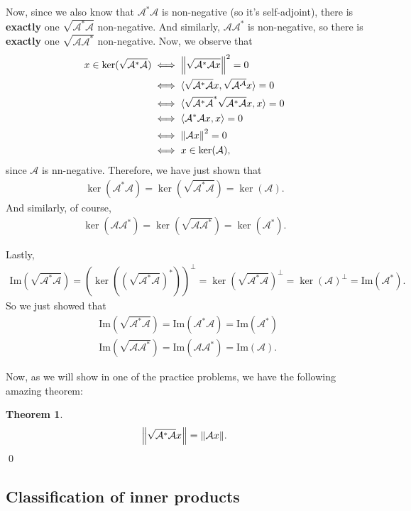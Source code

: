 \documentclass{article}
\theoremstyle{definition}
\newtheorem{thm}{Theorem}[section]
\newcommand{\A}{\mathcal{A}}
\newcommand{\ima}{\text{Im}}
\newcommand{\la}{\langle}
\newcommand{\ra}{\rangle}
\newcommand{\lp}{\left(}
\newcommand{\rp}{\right)}
\begin{document}
Now, since we also know that $\A^*\A$ is non-negative (so it's self-adjoint), there is \textbf{exactly} one $\sqrt{\A^*\A}$ non-negative. And similarly, $\A\A^*$ is non-negative, so there is \textbf{exactly} one $\sqrt{\A\A^*}$ non-negative. Now, we observe that
\begin{align*}
x \in \ker(\sqrt{\A^*\A}) &\iff \norm{\sqrt{\A^*\A x}}^2 = 0\\
&\iff \la \sqrt{\A^*\A} x , \sqrt{\A^\A} x \ra = 0\\
&\iff \la \sqrt{\A^*\A}^* \sqrt{\A^*\A}  x,x  \ra = 0\\
&\iff \la \A^*\A x,x \ra = 0\\
&\iff \norm{\A x}^2 = 0 \\
&\iff x\in \ker(\A),
\end{align*}
since $\A$ is nn-negative. Therefore, we have just shown that
\begin{align*}
\ker(\A^*\A) =\ker(\sqrt{\A^*\A}) = \ker(\A).
\end{align*}
And similarly, of course,
\begin{align*}
\ker(\A\A^*) = \ker(\sqrt{\A\A^*}) = \ker(\A^*).
\end{align*}

Lastly, 
\begin{align*}
\ima(\sqrt{\A^*\A}) = \lp \ker({(\sqrt{\A^*\A})}^*) \rp^\perp = \ker(\sqrt{\A^*\A})^\perp = \ker(\A)^\perp = \ima(\A^*).
\end{align*}
So we just showed that
\begin{align*}
& \ima(\sqrt{\A^*\A}) = \ima(\A^*\A) = \ima(\A^*)\\
& \ima(\sqrt{\A\A^*}) = \ima(\A\A^*) = \ima(\A).
\end{align*}


Now, as we will show in one of the practice problems, we have the following amazing theorem:

\begin{thm}
	\begin{align*}
	\norm{\sqrt{\A^*\A} x} = \norm{\A x}.
	\end{align*}\qed
\end{thm}









\subsection{Classification of inner products}
\end{document}
